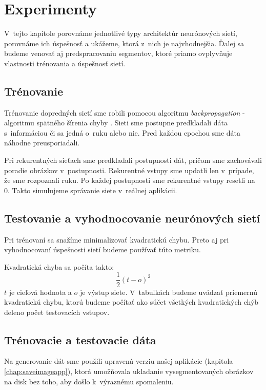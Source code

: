 \chapter{Experimenty}
\label{chap:experiments}

V~tejto kapitole porovnáme jednotlivé typy architektúr neurónových sietí, porovnáme ich úspešnosť a ukážeme, ktorá z~nich je najvhodnejšia. Ďalej sa budeme venovať aj predspracovaniu segmentov, ktoré priamo ovplyvňuje vlastnosti trénovania a úspešnosť sietí.
\bigskip

\section{Trénovanie}

Trénovanie dopredných sietí sme robili pomocou algoritmu \textit{backpropagation} - algoritmu spätného šírenia chyby \cite{haykin1999neural}. Sieti sme postupne predkladali dáta s~informáciou či sa jedná o~ruku alebo nie. Pred každou epochou sme dáta náhodne preusporiadali. 

Pri rekurentných sieťach sme predkladali postupnosti dát, pričom sme zachovávali poradie obrázkov v~postupnosti. Rekurentné vstupy sme updatli len v~prípade, že sme rozpoznali ruku. Po každej postupnosti sme rekurentné vstupy resetli na 0. Takto simulujeme správanie siete v~reálnej aplikácii.

\section{Testovanie a vyhodnocovanie neurónových sietí}
Pri trénovaní sa snažíme minimalizovať kvadratickú chybu. Preto aj pri vyhodnocovaní úspešnosti sietí budeme používať túto metriku.

Kvadratická chyba sa počíta takto: $$\frac{1}{2}(t-o)^2$$
$t$ je cieľová hodnota a $o$ je výstup siete. V~tabuľkách budeme uvádzať priemernú kvadratickú chybu, ktorú budeme počítať ako súčet všetkých kvadratických chýb deleno počet testovacích vstupov. 

\section{Trénovacie a testovacie dáta}

Na generovanie dát sme použili upravenú verziu našej aplikácie (kapitola \ref{chap:saveimageapp}), ktorá umožňovala ukladanie vysegmentovaných obrázkov na disk bez toho, aby došlo k~výraznému spomaleniu. 

